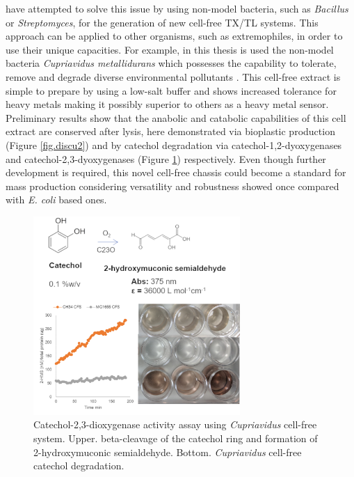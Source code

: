 \cite{moore2017cell} have attempted to solve this issue by using non-model bacteria, such as \textit{Bacillus} or \textit{Streptomyces}, for the generation of new cell-free TX/TL systems. This approach can be applied to other organisms, such as extremophiles, in order to use their unique capacities. For example, in this thesis is used the non-model bacteria \textit{Cupriavidus metallidurans} which possesses the capability to tolerate, remove and degrade diverse environmental pollutants \citep{millacura2017degradation}. This cell-free extract is simple to prepare by using a low-salt buffer and shows increased tolerance for heavy metals making it possibly superior to others as a heavy metal sensor. Preliminary results show that the anabolic and catabolic capabilities of this cell extract are conserved after lysis, here demonstrated via bioplastic production (Figure \ref{fig.discu2})  and by catechol degradation via catechol-1,2-dyoxygenases and catechol-2,3-dyoxygenases (Figure \ref{fig.discu3}) respectively. Even though further development is required, this novel cell-free chassis could become a standard for mass production considering versatility and robustness showed once compared with \textit{E. coli} based ones.

\begin{figure}[!ht]
  \centering
  \includegraphics[width=0.7\textwidth]{discussion/chapter/figs/degradation.png}
  \caption{Catechol-2,3-dioxygenase activity assay using \textit{Cupriavidus} cell-free system. Upper. beta-cleavage of the catechol ring and formation of 2-hydroxymuconic semialdehyde. Bottom. \textit{Cupriavidus} cell-free catechol degradation.}
  \label{fig.discu3}
\end{figure}


